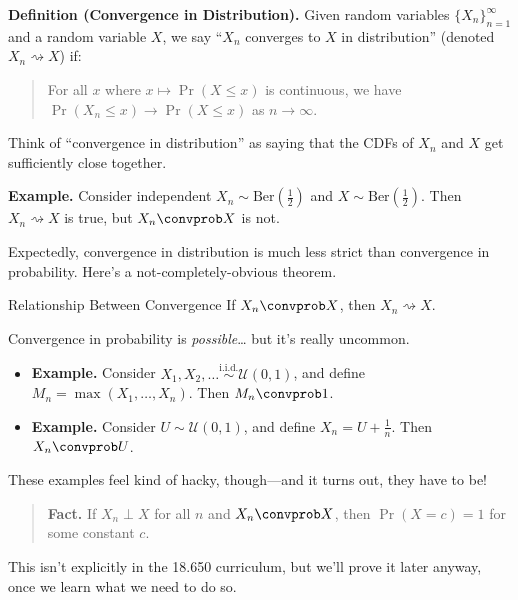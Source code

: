 \textbf{Definition (Convergence in Distribution).}
Given random variables $\{X_n\}_{n = 1}^{\infty}$ and a random variable $X$,
we say ``$X_n$ converges to $X$ in distribution'' (denoted $X_n \rightsquigarrow X$) if:
\begin{quote}
    For all $x$ where $x \mapsto \Pr(X \leq x)$ is continuous,
    we have $\Pr(X_n \leq x) \to \Pr(X \leq x)$ as $n \to \infty$.
\end{quote}

\begin{remark}
    Think of ``convergence in distribution'' as saying that the CDFs of $X_n$ and $X$
    get sufficiently close together.
\end{remark}

\textbf{Example.} Consider independent $X_n \sim \text{Ber}(\frac{1}{2})$
and $X \sim \text{Ber}(\frac{1}{2})$.  Then $X_n \rightsquigarrow X$ is true,
but $X_n \convprob X$ is not.

Expectedly, convergence in distribution is much less strict
than convergence in probability.
Here's a not-completely-obvious theorem.

\begin{theorem}{Relationship Between Convergence}
    If $X_n \convprob X$, then $X_n \rightsquigarrow X$.
\end{theorem}

\begin{remark}
    Convergence in probability is \emph{possible}\dots
    but it's really uncommon.
    \begin{itemize}
        \item \textbf{Example.} Consider
        $X_1, X_2, \dots \overset{\text{i.i.d.}}{\sim} \mathcal{U}(0, 1)$,
        and define $M_n = \max(X_1, \dots, X_n)$.
        Then $M_n \convprob 1$.
        \item \textbf{Example.} Consider $U \sim \mathcal{U}(0, 1)$,
        and define $X_n = U + \frac{1}{n}$.  Then $X_n \convprob U$.
    \end{itemize}
    These examples feel kind of hacky, though---and it turns out, they have to be!
    \begin{quote}
        \textbf{Fact.} If $X_n \perp X$ for all $n$ and $X_n \convprob X$,
        then $\Pr(X = c) = 1$ for some constant $c$.
    \end{quote}
    This isn't explicitly in the 18.650 curriculum, but we'll prove it later anyway,
    once we learn what we need to do so.
\end{remark}

